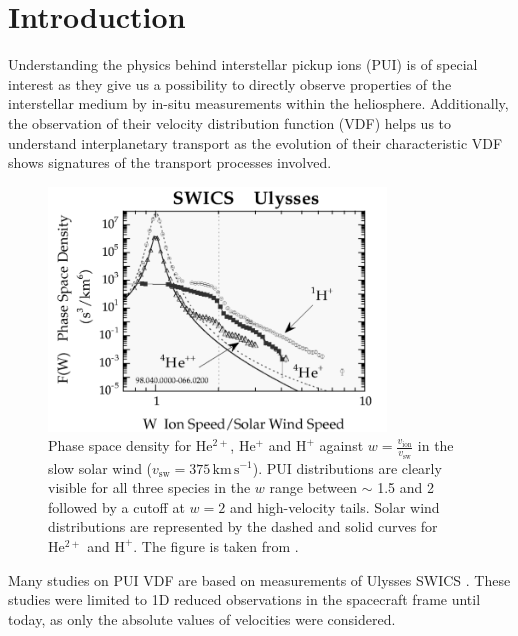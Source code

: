 
\chapter{Introduction} %

\label{chap:intro} %



Understanding the physics behind interstellar pickup ions (PUI) is of special interest as they give us a possibility to directly observe properties of the interstellar medium by in-situ measurements within the heliosphere. 
Additionally, the observation of their velocity distribution function (VDF) helps us to understand interplanetary transport as the evolution of their characteristic VDF shows signatures of the transport processes involved.
\begin{figure}[h]
	\includegraphics[width=0.8\textwidth]{Figures/sw_pui_gloeckler.png}
	\centering
	\caption{Phase space density for $\mathrm{He^{2+}}$, $\mathrm{He^{+}}$ and $\mathrm{H^{+}}$ against $w = \frac{v_\mathrm{ion}}{v_\mathrm{sw}}$ in the slow solar wind ($v_\mathrm{sw} = 375\,\mathrm{km\,s^{-1}}$). PUI distributions are clearly visible for all three species in the $w$ range between $\sim$ 1.5 and 2 followed by a cutoff at $w = 2$ and high-velocity tails. Solar wind distributions are represented by the dashed and solid curves for $\mathrm{He^{2+}}$ and $\mathrm{H^{+}}$. The figure is taken from \citet{gloeckler1999}.} 
	\label{fig:gloeckler}
\end{figure}
Many studies on PUI VDF are based on measurements of Ulysses SWICS \citep{gloeckler_geiss}.
These studies were limited to 1D reduced observations in the spacecraft frame until today, as only the absolute values of velocities were considered.

